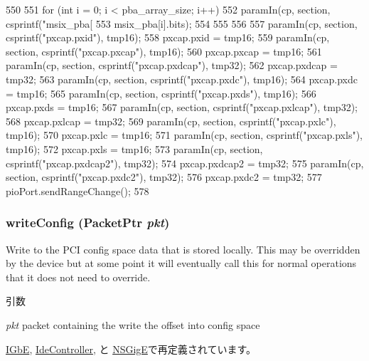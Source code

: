 \begin{DoxyCode}
{{{550         }
551         for (int i = 0; i < pba_array_size; i++) {
552             paramIn(cp, section, csprintf("msix_pba[%
553                     msix_pba[i].bits);
554         }
555     }
556 
557     paramIn(cp, section, csprintf("pxcap.pxid"), tmp16);
558     pxcap.pxid = tmp16;
559     paramIn(cp, section, csprintf("pxcap.pxcap"), tmp16);
560     pxcap.pxcap = tmp16;
561     paramIn(cp, section, csprintf("pxcap.pxdcap"), tmp32);
562     pxcap.pxdcap = tmp32;
563     paramIn(cp, section, csprintf("pxcap.pxdc"), tmp16);
564     pxcap.pxdc = tmp16;
565     paramIn(cp, section, csprintf("pxcap.pxds"), tmp16);
566     pxcap.pxds = tmp16;
567     paramIn(cp, section, csprintf("pxcap.pxlcap"), tmp32);
568     pxcap.pxlcap = tmp32;
569     paramIn(cp, section, csprintf("pxcap.pxlc"), tmp16);
570     pxcap.pxlc = tmp16;
571     paramIn(cp, section, csprintf("pxcap.pxls"), tmp16);
572     pxcap.pxls = tmp16;
573     paramIn(cp, section, csprintf("pxcap.pxdcap2"), tmp32);
574     pxcap.pxdcap2 = tmp32;
575     paramIn(cp, section, csprintf("pxcap.pxdc2"), tmp32);
576     pxcap.pxdc2 = tmp32;
577     pioPort.sendRangeChange();
578 }
\end{DoxyCode}
\hypertarget{classPciDevice_aac7b61a78530109bfa20923a53064bbf}{
\subsubsection[{writeConfig}]{ writeConfig ({\bf PacketPtr} {\em pkt})}}
\label{classPciDevice_aac7b61a78530109bfa20923a53064bbf}
Write to the PCI config space data that is stored locally. This may be overridden by the device but at some point it will eventually call this for normal operations that it does not need to override. 
\begin{DoxyParams}{引数}
\item[{\em pkt}]packet containing the write the offset into config space \end{DoxyParams}


\hyperlink{classIGbE_aac7b61a78530109bfa20923a53064bbf}{IGbE}, \hyperlink{classIdeController_aac7b61a78530109bfa20923a53064bbf}{IdeController}, と \hyperlink{classNSGigE_aac7b61a78530109bfa20923a53064bbf}{NSGigE}で再定義されています。


